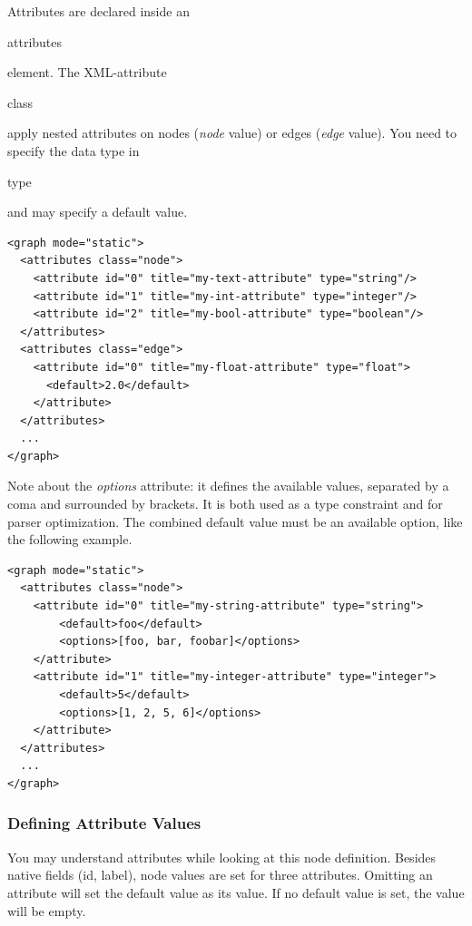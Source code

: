 \documentclass[a4paper,10pt]{article}
\begin{document}
Attributes are declared inside an \begin{footnotesize}attributes\end{footnotesize} element. The XML-attribute \begin{footnotesize}class\end{footnotesize} apply nested attributes on nodes (\textit{node} value) or edges (\textit{edge} value). You need to specify the data type in \begin{footnotesize}type\end{footnotesize} and may specify a default value.

\lstset{ style=gexf }
\begin{lstlisting}[caption={Attributes Definition},label=attributesDef]
<graph mode="static">
  <attributes class="node">
    <attribute id="0" title="my-text-attribute" type="string"/>
    <attribute id="1" title="my-int-attribute" type="integer"/>
    <attribute id="2" title="my-bool-attribute" type="boolean"/>
  </attributes>
  <attributes class="edge">
    <attribute id="0" title="my-float-attribute" type="float">
      <default>2.0</default>
    </attribute>
  </attributes>
  ...
</graph>
\end{lstlisting}

Note about the \textit{options} attribute: it defines the available values, separated by a coma and surrounded by brackets. It is both used as a type constraint and for parser optimization. The combined default value must be an available option, like the following example.

\lstset{ style=gexf }
\begin{lstlisting}[caption={Options},label=optionsDef]
<graph mode="static">
  <attributes class="node">
    <attribute id="0" title="my-string-attribute" type="string">
        <default>foo</default>
        <options>[foo, bar, foobar]</options>
    </attribute>
    <attribute id="1" title="my-integer-attribute" type="integer">
        <default>5</default>
        <options>[1, 2, 5, 6]</options>
    </attribute>
  </attributes>
  ...
</graph>
\end{lstlisting}

\subsubsection{Defining Attribute Values}

You may understand attributes while looking at this node definition. Besides native fields (id, label), node values are set for three attributes. Omitting an attribute will set the default value as its value. If no default value is set, the value will be empty.
\end{document}
